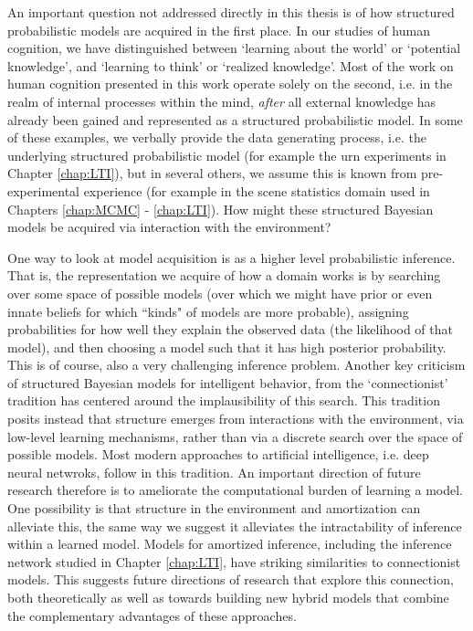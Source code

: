 An important question not addressed directly in this thesis is of how structured probabilistic models are acquired in the first place. In our studies of human cognition, we have distinguished between `learning about the world' or `potential knowledge', and `learning to think' or `realized knowledge'. Most of the work on human cognition presented in this work operate solely on the second, i.e. in the realm of internal processes within the mind, \textit{after} all external knowledge has already been gained and represented as a structured probabilistic model. In some of these examples, we verbally provide the data generating process, i.e. the underlying structured probabilistic model (for example the urn experiments in Chapter \ref{chap:LTI}), but in several others, we assume this is known from pre-experimental experience (for example in the scene statistics domain used in Chapters \ref{chap:MCMC} - \ref{chap:LTI}). How might these structured Bayesian models be acquired via interaction with the environment?

One way to look at model acquisition is as a higher level probabilistic inference. That is, the representation we acquire of how a domain works is by searching over some space of possible models (over which we might have prior or even innate beliefs for which ``kinds" of models are more probable), assigning probabilities for how well they explain the observed data (the likelihood of that model), and then choosing a model such that it has high posterior probability. This is of course, also a very challenging inference problem. Another key criticism of structured Bayesian models for intelligent behavior, from the `connectionist' tradition has centered around the implausibility of this search.\cite{rogers2004semantic, mcclelland2010letting} This tradition posits instead that structure emerges from interactions with the environment, via low-level learning mechanisms, rather than via a discrete search over the space of possible models. Most modern approaches to artificial intelligence, i.e. deep neural netwroks, follow in this tradition. An important direction of future research therefore is to ameliorate the computational burden of learning a model. One possibility is that structure in the environment and amortization can alleviate this, the same way we suggest it alleviates the intractability of inference within a learned model. Models for amortized inference, including the inference network studied in Chapter \ref{chap:LTI}, have striking similarities to connectionist models. This suggests future directions of research that explore this connection, both theoretically as well as towards building new hybrid models that combine the complementary advantages of these approaches.

